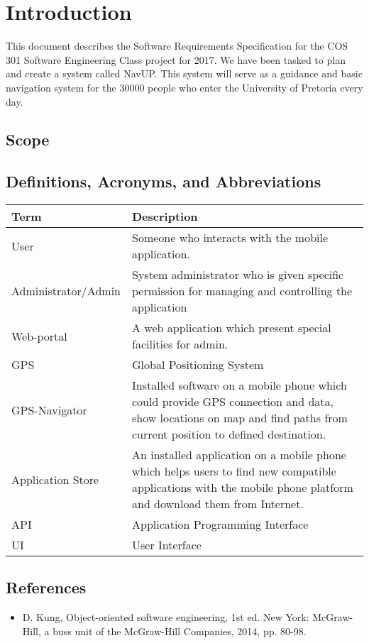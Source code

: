 \documentclass[12pt,a4paper]{article}
\begin{document}


\tableofcontents
\newpage

\section{Introduction}
This document describes the Software Requirements Specification for the COS 301 Software Engineering Class project for 2017. We have been tasked to plan and create a system called NavUP. This system will serve as a guidance and basic navigation system for the 30000 people who enter the University of Pretoria every day.
	\subsection{Scope}
	\subsection{Definitions, Acronyms, and Abbreviations}
		\begin{tabular}{|p{4cm}|p{10cm}|}
			\hline
				\textbf{Term} & \textbf{Description}\\
			\hline
				User & Someone who interacts with the mobile application.\\
			\hline
				Administrator/Admin & System administrator who is given specific permission for managing and controlling the application\\
			\hline
				Web-portal & A web application which present special facilities for admin.\\
			\hline
				GPS & Global Positioning System\\
			\hline
				GPS-Navigator & Installed software on a mobile phone which could provide GPS
connection and data, show locations on map and find paths from current position to defined destination.\\
			\hline
				Application Store & An installed application on a mobile phone which helps users to find new compatible applications with the mobile phone platform and download them from Internet.\\
			\hline
				API & Application Programming Interface\\
			\hline
				UI & User Interface\\
			\hline
		\end{tabular}
	\subsection{References}
		\begin{itemize}
			\item D. Kung, Object-oriented software engineering, 1st ed. New York: McGraw-Hill, a buss unit of the McGraw-Hill Companies, 2014, pp. 80-98.
		\end{itemize}
\end{document}

